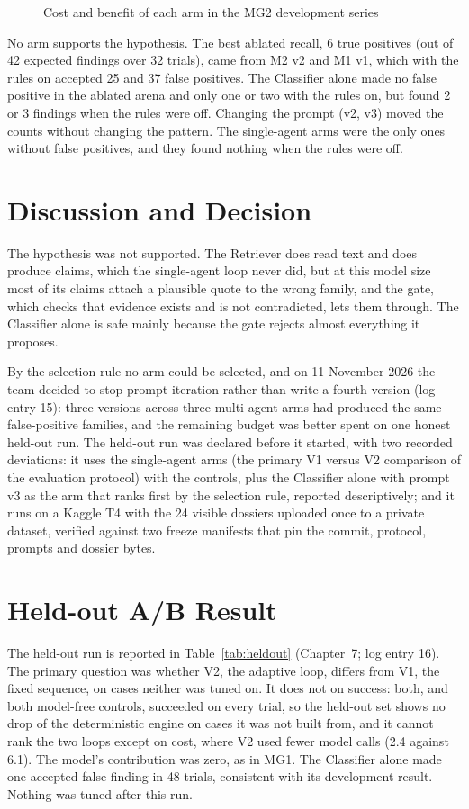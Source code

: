 \begin{figure}[htbp]
\centering

\caption{Cost and benefit of each arm in the MG2 development series}
\label{fig:mg2plot}
\end{figure}

No arm supports the hypothesis. The best ablated recall, 6 true positives (out of 42 expected
findings over 32 trials), came from M2 v2 and M1 v1, which with the rules on accepted 25 and 37 false
positives. The Classifier alone made no false positive in the ablated arena and only one or two with
the rules on, but found 2 or 3 findings when the rules were off. Changing the prompt (v2, v3) moved
the counts without changing the pattern. The single-agent arms were the only ones without false
positives, and they found nothing when the rules were off.

\section{Discussion and Decision}
The hypothesis was not supported. The Retriever does read text and does produce claims, which the
single-agent loop never did, but at this model size most of its claims attach a plausible quote to
the wrong family, and the gate, which checks that evidence exists and is not contradicted, lets them
through. The Classifier alone is safe mainly because the gate rejects almost everything it proposes.

By the selection rule no arm could be selected, and on 11 November 2026 the team decided to stop
prompt iteration rather than write a fourth version (log entry 15): three versions across three
multi-agent arms had produced the same false-positive families, and the remaining budget was better
spent on one honest held-out run. The held-out run was declared before it started, with two recorded
deviations: it uses the single-agent arms (the primary V1 versus V2 comparison of the evaluation
protocol) with the controls, plus the Classifier alone with prompt v3 as the arm that ranks first by
the selection rule, reported descriptively; and it runs on a Kaggle T4 with the 24 visible dossiers
uploaded once to a private dataset, verified against two freeze manifests that pin the commit,
protocol, prompts and dossier bytes.

\section{Held-out A/B Result}
The held-out run is reported in Table~\ref{tab:heldout} (Chapter~7; log entry 16). The primary question
was whether V2, the adaptive loop, differs from V1, the fixed sequence, on cases neither was tuned on.
It does not on success: both, and both model-free controls, succeeded on every trial, so the
held-out set shows no drop of the deterministic engine on cases it was not built from, and it cannot
rank the two loops except on cost, where V2 used fewer model calls (2.4 against 6.1). The model's
contribution was zero, as in MG1. The Classifier alone made one accepted false finding in 48 trials,
consistent with its development result. Nothing was tuned after this run.
